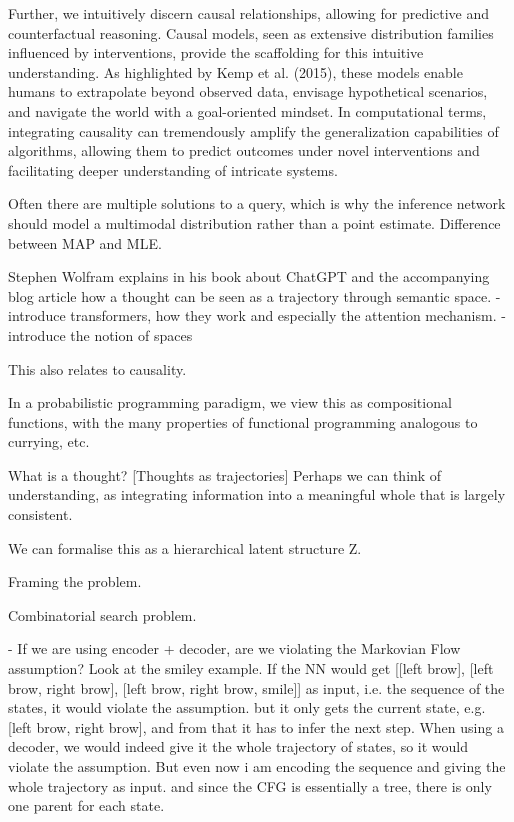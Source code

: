Further, we intuitively discern causal relationships, allowing for predictive and counterfactual reasoning.
Causal models, seen as extensive distribution families influenced by interventions, provide the scaffolding for this intuitive understanding. As highlighted by Kemp et al. (2015), these models enable humans to extrapolate beyond observed data, envisage hypothetical scenarios, and navigate the world with a goal-oriented mindset. In computational terms, integrating causality can tremendously amplify the generalization capabilities of algorithms, allowing them to predict outcomes under novel interventions and facilitating deeper understanding of intricate systems.

Often there are multiple solutions to a query, which is why the inference network should model a multimodal distribution rather than a point estimate. Difference between MAP and MLE. 




Stephen Wolfram explains in his book about ChatGPT and the accompanying blog article how a thought can be seen as a trajectory through semantic space. 
- introduce transformers, how they work and especially the attention mechanism.
- introduce the notion of spaces

This also relates to causality.

In a probabilistic programming paradigm, we view this as compositional functions, with the many properties of functional programming analogous to currying, etc. 

What is a thought?
[Thoughts as trajectories]
Perhaps we can think of understanding, as integrating information into a meaningful whole that is largely consistent.



We can formalise this as a hierarchical latent structure Z.

Framing the problem.

Combinatorial search problem. 

- If we are using encoder + decoder, are we violating the Markovian Flow assumption?
    Look at the smiley example. If the NN would get [[left brow], [left brow, right brow], [left brow, right brow, smile]] as input, i.e. the sequence of the states, it would violate the assumption. but it only gets the current state, e.g. [left brow, right brow], and from that it has to infer the next step. 
    When using a decoder, we would indeed give it the whole trajectory of states, so it would violate the assumption.
    But even now i am encoding the sequence and giving the whole trajectory as input. and since the CFG is essentially a tree, there is only one parent for each state. 

